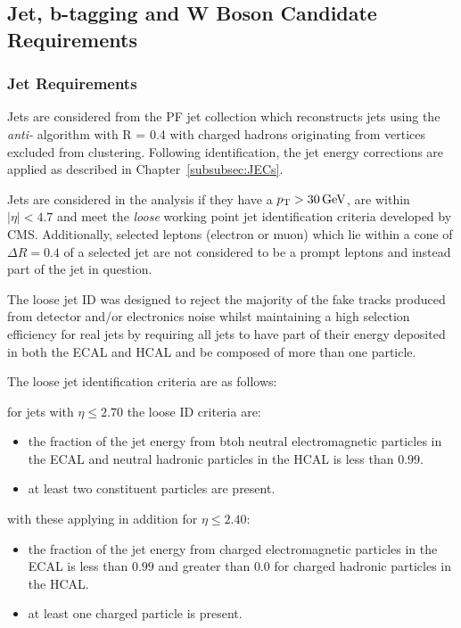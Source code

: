 \subsection{Jet, b-tagging and W Boson Candidate Requirements}
\subsubsection{Jet Requirements}
Jets are considered from the PF jet collection which reconstructs jets using the \emph{anti-\kt} algorithm with R = 0.4 with charged hadrons originating from \PU vertices excluded from clustering.
Following identification, the jet energy corrections are applied as described in Chapter~\ref{subsubsec:JECs}.

Jets are considered in the analysis if they have a $p_{\mathrm{T}} > 30\,\text{Ge\hspace{-.08em}V}$, are within $|\eta| < 4.7$ and meet the \emph{loose} working point jet identification criteria developed by CMS.
Additionally, selected leptons (electron or muon) which lie within a cone of $\Delta R = 0.4$ of a selected jet are not considered to be a prompt leptons and instead part of the jet in question.

The loose jet ID was designed to reject the majority of the fake tracks produced from detector and/or electronics noise whilst maintaining a high selection efficiency for real jets by requiring all jets to have part of their energy deposited in both the ECAL and HCAL and be composed of more than one particle.

The loose jet identification criteria are as follows:

for jets with $\eta \leq 2.70$ the loose ID criteria are:
\begin{itemize}
\item the fraction of the jet energy from btoh neutral electromagnetic particles in the ECAL and neutral hadronic particles in the HCAL is less than $0.99$.
\item at least two constituent particles are present.
\end{itemize}

with these applying in addition for $\eta \leq 2.40$:
\begin{itemize}
\item the fraction of the jet energy from charged electromagnetic particles in the ECAL is less than $0.99$ and greater than 0.0 for charged hadronic particles in the HCAL.
\item at least one charged particle is present.
\end{itemize}



